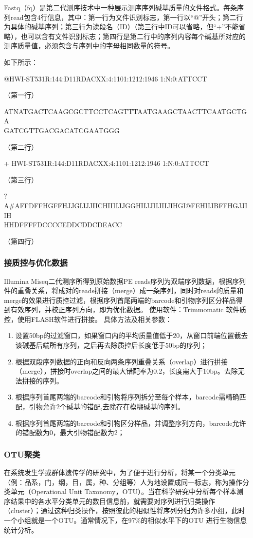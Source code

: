     Fastq（fq）是第二代测序技术中一种展示测序序列碱基质量的文件格式。每条序列read包含4行信息，其中：第一行为文件识别标志，第一行以“@”开头；第二行为具体的碱基序列；第三行为读段名（ID）（第三行中ID可以省略，但“+”不能省略），也可以含有文件识别标志；第四行是第二行中的序列内容每个碱基所对应的测序质量值，必须包含与序列中的字母相同数量的符号。

    如下所示：

    @HWI-ST531R:144:D11RDACXX:4:1101:1212:1946 1:N:0:ATTCCT

    （第一行）


    ATNATGACTCAAGCGCTTCCTCAGTTTAATGAAGCTAACTTCAATGCTGA\\ \qquad GATCGTTGACGACATCGAATGGG

    （第二行）

    + HWI-ST531R:144:D11RDACXX:4:1101:1212:1946 1:N:0:ATTCCT

    （第三行）

    ?A\#AFFDFFHGFFHJJGIJJJIICHIIIIJJGGHIIJJIIJIIJIHGI@FEHIIJBFFHGJJIIH\\ \qquad HHDFFFFDCCCCEDDCDDCDEACC

    （第四行）
    \subsubsection{接质控与优化数据}
    Illumina Miseq二代测序所得到原始数据PE reads序列为双端序列数据，根据序列件的重叠关系，将成对的reads拼接（merge）成一条序列，同时对reads的质量和merge的效果进行质控过滤，根据序列首尾两端的barcode和引物序列区分样品得到有效序列，并校正序列方向，即为优化数据。
    使用软件：Trimmomatic 软件质控，使用FLASH软件进行拼接。
    具体方法及相关参数：
      \begin{enumerate}
        \item 设置50bp的过滤窗口，如果窗口内的平均质量值低于20，从窗口前端位置截去该碱基后端所有序列，之后再去除质控后长度低于50bp的序列；
        \item  根据双段序列数据的正向和反向两条序列重叠关系（overlap）进行拼接（merge），拼接时overlap之间的最大错配率为0.2，长度需大于10bp。去除无法拼接的序列。
        \item 根据序列首尾两端的barcode和引物将序列拆分至每个样本，barcode需精确匹配，引物允许2个碱基的错配,去除存在模糊碱基的序列。
        \item 根据序列首尾两端的barcode和引物区分样品，并调整序列方向，barcode允许的错配数为0，最大引物错配数为2；
      \end{enumerate}
    \subsubsection{OTU聚类}
    在系统发生学或群体遗传学的研究中，为了便于进行分析，将某一个分类单元（例：品系，门，纲，目，属，种、分组等）人为地设置成同一标志，称为操作分类单元（Operational Unit Taxonomy，OTU）。当在科学研究中分析每个样本测序结果中的各水平分类单元的数目信息前，就需要对序列进行归类操作（cluster）；通过这种归类操作，按照彼此的相似性将序列分归为许多小组，此时一个小组就是一个OTU。通常情况下，在97\%的相似水平下的OTU 进行生物信息统计分析。

